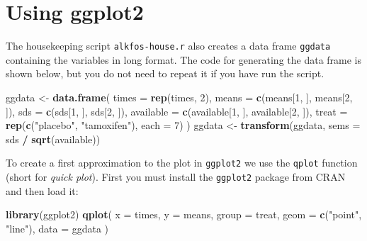\documentclass[
]{book}
\newenvironment{Shaded}{\begin{snugshade}}{\end{snugshade}}
\newcommand{\AttributeTok}[1]{\textcolor[rgb]{0.13,0.29,0.53}{#1}}
\newcommand{\DecValTok}[1]{\textcolor[rgb]{0.00,0.00,0.81}{#1}}
\newcommand{\FunctionTok}[1]{\textcolor[rgb]{0.13,0.29,0.53}{\textbf{#1}}}
\newcommand{\NormalTok}[1]{#1}
\newcommand{\OtherTok}[1]{\textcolor[rgb]{0.56,0.35,0.01}{#1}}
\newcommand{\SpecialCharTok}[1]{\textcolor[rgb]{0.81,0.36,0.00}{\textbf{#1}}}
\newcommand{\StringTok}[1]{\textcolor[rgb]{0.31,0.60,0.02}{#1}}
\begin{document}
\section{Using ggplot2}\label{using-ggplot2}

The housekeeping script \texttt{alkfos-house.r} also creates a data
frame \texttt{ggdata} containing the variables in long format. The
code for generating the data frame is shown below, but you do not need
to repeat it if you have run the script.

\begin{Shaded}
\begin{Highlighting}[]
\NormalTok{ggdata }\OtherTok{\textless{}{-}} \FunctionTok{data.frame}\NormalTok{(}
  \AttributeTok{times =} \FunctionTok{rep}\NormalTok{(times, }\DecValTok{2}\NormalTok{),}
  \AttributeTok{means =} \FunctionTok{c}\NormalTok{(means[}\DecValTok{1}\NormalTok{, ], means[}\DecValTok{2}\NormalTok{, ]),}
  \AttributeTok{sds =} \FunctionTok{c}\NormalTok{(sds[}\DecValTok{1}\NormalTok{, ], sds[}\DecValTok{2}\NormalTok{, ]),}
  \AttributeTok{available =} \FunctionTok{c}\NormalTok{(available[}\DecValTok{1}\NormalTok{, ], available[}\DecValTok{2}\NormalTok{, ]),}
  \AttributeTok{treat =} \FunctionTok{rep}\NormalTok{(}\FunctionTok{c}\NormalTok{(}\StringTok{"placebo"}\NormalTok{, }\StringTok{"tamoxifen"}\NormalTok{), }\AttributeTok{each =} \DecValTok{7}\NormalTok{)}
\NormalTok{)}
\NormalTok{ggdata }\OtherTok{\textless{}{-}} \FunctionTok{transform}\NormalTok{(ggdata, }\AttributeTok{sems =}\NormalTok{ sds }\SpecialCharTok{/} \FunctionTok{sqrt}\NormalTok{(available))}
\end{Highlighting}
\end{Shaded}

To create a first approximation to the plot in \texttt{ggplot2} we
use the \texttt{qplot} function (short for \emph{quick plot}). First you
must install the \texttt{ggplot2} package from CRAN and then load it:

\begin{Shaded}
\begin{Highlighting}[]
\FunctionTok{library}\NormalTok{(ggplot2)}
\FunctionTok{qplot}\NormalTok{(}
  \AttributeTok{x =}\NormalTok{ times, }
  \AttributeTok{y =}\NormalTok{ means, }
  \AttributeTok{group =}\NormalTok{ treat, }
  \AttributeTok{geom =} \FunctionTok{c}\NormalTok{(}\StringTok{"point"}\NormalTok{, }\StringTok{"line"}\NormalTok{), }
  \AttributeTok{data =}\NormalTok{ ggdata}
\NormalTok{)}
\end{Highlighting}
\end{Shaded}
\end{document}
